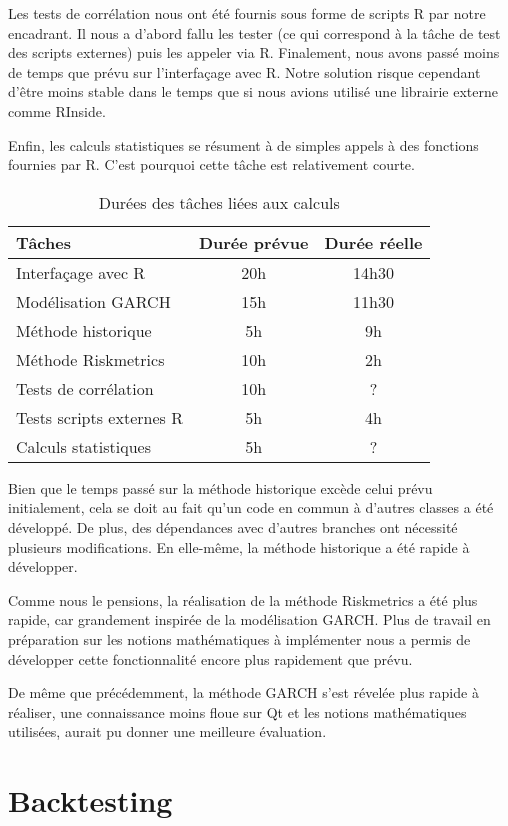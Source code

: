 \documentclass[a4paper]{report}
\begin{document}
Les tests de corrélation nous ont été fournis sous forme de scripts R par notre encadrant.
Il nous a d'abord fallu les tester (ce qui correspond à la tâche de test des scripts externes) puis les appeler via R.
Finalement, nous avons passé moins de temps que prévu sur l'interfaçage avec R.
Notre solution risque cependant d'être moins stable dans le temps que si nous avions utilisé une librairie externe comme RInside.

Enfin, les calculs statistiques se résument à de simples appels à des fonctions fournies par R.
C'est pourquoi cette tâche est relativement courte.

\begin{table}[H]
\centering
  \begin{tabularx}{0.8\textwidth}{| X | c | c |}
    \hline
	Tâches & Durée prévue & Durée réelle \\
    \hline
    Interfaçage avec R &  20h  & 14h30\\
    Modélisation GARCH &  15h & 11h30\\
    Méthode historique &  5h & 9h\\
    Méthode Riskmetrics &  10h & 2h\\
    Tests de corrélation &  10h & ?\\
    Tests scripts externes R & 5h & 4h\\
    Calculs statistiques &  5h & ?\\
    \hline
  \end{tabularx}
  \caption{Durées des tâches liées aux calculs}
\end{table}

Bien que le temps passé sur la méthode historique excède celui prévu initialement, cela se doit au fait qu'un code en commun à d'autres classes a été développé.
De plus, des dépendances avec d'autres branches ont nécessité plusieurs modifications.
En elle-même, la méthode historique a été rapide à développer.

Comme nous le pensions, la réalisation de la méthode Riskmetrics a été plus rapide, car grandement inspirée de la modélisation GARCH.
Plus de travail en préparation sur les notions mathématiques à implémenter nous a permis de développer cette fonctionnalité encore plus rapidement que prévu.

De même que précédemment, la méthode GARCH s'est révelée plus rapide à réaliser, une connaissance moins floue sur Qt et les notions mathématiques utilisées, aurait pu donner une meilleure évaluation.


\section{Backtesting}
\end{document}

